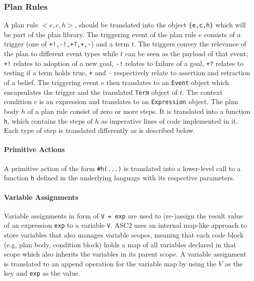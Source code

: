 \subsubsection{Plan Rules}
A plan rule $<e,c,h>$, should be translated into the object \verb+{e,c,h}+ which will be part of the plan library. The triggering event of the plan rule $e$ consists of a trigger (one of \verb#+!,-!,+?,+,-#) and a term $t$. The triggers convey the relevance of the plan to different event types while $t$ can be seen as the payload of that event; \verb#+!# relates to adoption of a new goal, \verb#-!# relates to failure of a goal, \verb#+?# relates to testing if a term holds true, \verb#+# and \verb#-# respectively relate to assertion and retraction of a belief. The triggering event $e$ then translates to an \verb+Event+ object which encapsulates the trigger and the translated \verb+Term+ object of $t$. The context condition $c$ is an expression and translates to an \verb+Expression+ object. The plan body $h$ of a plan rule consist of zero or more steps. %
It is translated into a function \verb+h+, which contains the steps of $h$ as imperative lines of code implemented in it. Each type of step is translated differently as is described below.

\paragraph{Primitive Actions}
A primitive action of the form \verb+#h(...)+ %
is translated into a lower-level call to a function \verb+h+ defined in the underlying language with its respective parameters. %

\paragraph{Variable Assignments}
Variable assignments in form of \verb+V = exp+ are used to (re-)assign the result value of an expression \verb+exp+ to a variable \verb+V+. ASC2 uses an internal map-like approach to store variables that also manages variable scopes, meaning that each code block (e.g, plan body, condition block) holds a map of all variables declared in that scope which also inherits the variables in its parent scope. A variable assignment is translated to an append operation for the variable map by using the $V$ as the key and \verb+exp+ as the value.

